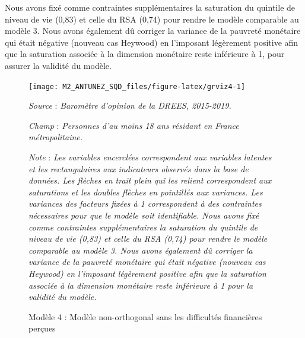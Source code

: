 \documentclass[12pt,a4paper]{reedthesis}
\begin{document}
Nous avons fixé comme contraintes supplémentaires la saturation du quintile de niveau de vie (0,83) et celle du RSA (0,74) pour rendre le modèle comparable au modèle 3. Nous avons également dû corriger la variance de la pauvreté monétaire qui était négative (nouveau cas Heywood) en l'imposant légèrement positive afin que la saturation associée à la dimension monétaire reste inférieure à 1, pour assurer la validité du modèle.
\begin{figure}[!ht]

{\centering \texttt{[image: M2\_ANTUNEZ\_SQD\_files/figure-latex/grviz4-1]} 

}

\caption[Modèle 4 ]{Modèle 4 : Modèle non-orthogonal sans les difficultés financières perçues}\label{fig:grviz4}

\footnotesize


\emph{Source} : \emph{Baromètre d’opinion de la DREES, 2015-2019.}


\emph{Champ} : \emph{Personnes d’au moins 18 ans résidant en France métropolitaine.}


\emph{Note} : \emph{Les variables encerclées correspondent aux variables latentes et les rectangulaires aux indicateurs observés dans la base de données. Les flèches en trait plein qui les relient correspondent aux saturations et les doubles flèches en pointillés aux variances. Les variances des facteurs fixées à 1 correspondent à des contraintes nécessaires pour que le modèle soit identifiable. Nous avons fixé comme contraintes supplémentaires la saturation du quintile de niveau de vie (0,83) et celle du RSA (0,74) pour rendre le modèle comparable au modèle 3. Nous avons également dû corriger la variance de la pauvreté monétaire qui était négative (nouveau cas Heywood) en l’imposant légèrement positive afin que la saturation associée à la dimension monétaire reste inférieure à 1 pour la validité du modèle. }
\normalsize\end{figure}
\end{document}
